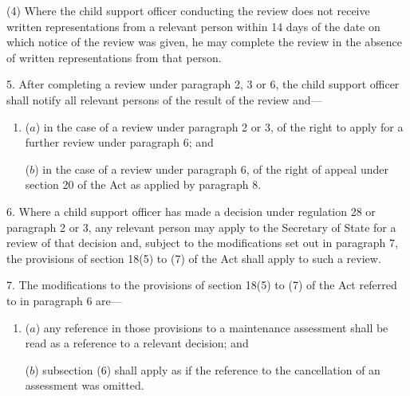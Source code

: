 \documentclass[12pt,a4paper]{article}
\begin{document}
(4) Where the child support officer conducting the review does not receive written representations from a relevant person within 14 days of the date on which notice of the review was given, he may complete the review in the absence of written representations from that person.


\medskip

5.  After completing a review under paragraph 2, 3 or 6, the child support officer shall notify all relevant persons of the result of the review and---
\begin{enumerate}\item[]
($a$) in the case of a review under paragraph 2 or 3, of the right to apply for a further review under paragraph 6; and

($b$) in the case of a review under 
paragraph 6, %
of the right of appeal under section 20 of the Act as applied by paragraph 8.
\end{enumerate}


\medskip

6.  Where a child support officer has made a decision under regulation 28 or paragraph 2 or 3, any relevant person may apply to the Secretary of State for a review of that decision and, subject to the modifications set out in paragraph 7, the provisions of section 18(5) to (7) of the Act shall apply to such a review.

\medskip

7.  The modifications to the provisions of section 18(5) to (7) of the Act referred to in paragraph 6 are---
\begin{enumerate}\item[]
($a$) any reference in those provisions to a maintenance assessment shall be read as a reference to a relevant decision; and

($b$) subsection (6) shall apply as if the reference to the cancellation of an assessment was omitted.
\end{enumerate}

\medskip

\end{document}
